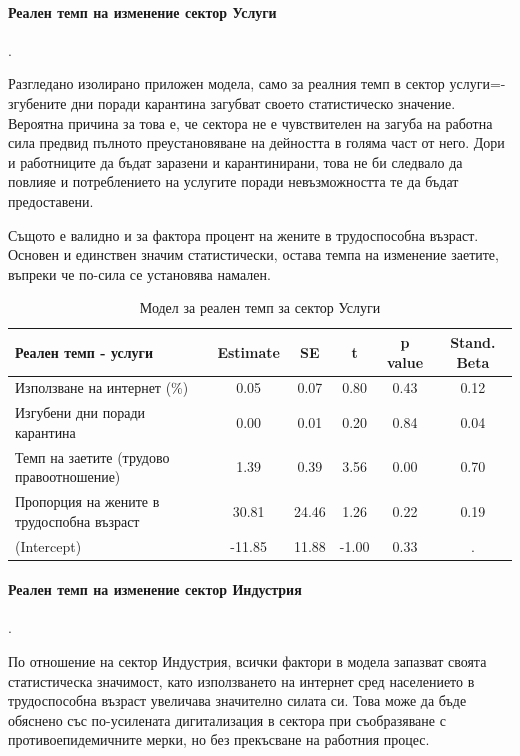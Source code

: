 \documentclass[a4paper,12pt]{article}
\begin{document}
\paragraph{Реален темп на изменение сектор Услуги}.

Разгледано изолирано приложен модела, само за реалния темп в сектор услуги=- згубените дни поради карантина загубват своето статистическо значение. Вероятна причина за това е, че сектора не е чувствителен на загуба на работна сила предвид пълното преустановяване на дейността в голяма част от него. Дори и работниците да бъдат заразени и карантинирани, това не би следвало да повлияе и потреблението на услугите поради невъзможността те да бъдат предоставени.

Същото е валидно и за фактора процент на жените в трудоспособна възраст. Основен и единствен значим статистически, остава темпа на изменение заетите, въпреки че по-сила се установява намален.

\begin{table}[ht]
	\centering
	\caption{Модел за реален темп за сектор Услуги}
	\begin{tabular}{lccccc}
		\toprule
		Реален темп - услуги & Estimate & SE    & t     & p value & Stand. Beta \\
		\midrule
		Използване на интернет (\%) & 0.05  & 0.07  & 0.80  & 0.43  & 0.12 \\
		Изгубени дни поради карантина  & 0.00  & 0.01  & 0.20  & 0.84  & 0.04 \\
		Темп на заетите (трудово правоотношение) & 1.39  & 0.39  & 3.56  & 0.00  & 0.70 \\
		Пропорция на жените в трудоспобна възраст  & 30.81 & 24.46 & 1.26  & 0.22  & 0.19 \\
		(Intercept) & -11.85 & 11.88 & -1.00 & 0.33  & . \\
		\bottomrule
	\end{tabular}%
	\label{tab:addlabel}%
\end{table}%

\paragraph{Реален темп на изменение сектор Индустрия}.

По отношение на сектор Индустрия, всички фактори в модела запазват своята статистическа значимост, като използването на интернет сред населението в трудоспособна възраст увеличава значително силата си. Това може да бъде обяснено със по-усилената дигитализация в сектора при съобразяване с противоепидемичните мерки, но без прекъсване на работния процес. 
\end{document}
